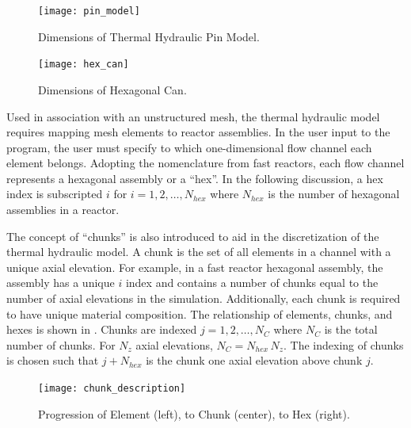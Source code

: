   \begin{figure}
    \centering
    \texttt{[image: pin\_model]}
    \caption{Dimensions of Thermal Hydraulic Pin Model.}
    \label{fig:pin_model}
  \end{figure}

  \begin{figure}
    \centering
    \texttt{[image: hex\_can]}
    \caption{Dimensions of Hexagonal Can.}
    \label{fig:hex_can}
  \end{figure}
  
  Used in association with an unstructured mesh, the thermal hydraulic model
  requires mapping mesh elements to reactor assemblies. In the user input to the
  program, the user must specify to which one-dimensional flow channel each
  element belongs.
  Adopting the nomenclature from fast reactors, each flow channel represents a
  hexagonal assembly or a ``hex''. In the following discussion, a hex index is
  subscripted $i$ for $i = 1,2,\ldots,N_{hex}$ where $N_{hex}$ is the number of
  hexagonal assemblies in a reactor. 

  The concept of ``chunks'' is also introduced to aid in the discretization of
  the thermal hydraulic model. A chunk is the set of all elements in a channel
  with a unique axial elevation. For example, in a fast reactor hexagonal
  assembly, the assembly has a unique $i$ index and contains a number of chunks
  equal to the number of axial elevations in the simulation. Additionally, each 
  chunk is required to have unique material composition. The relationship of
  elements, chunks, and hexes is shown in . Chunks
  are indexed $j = 1,2,\ldots,N_C$ where $N_C$ is the total number of chunks.
  For $N_z$ axial elevations, $N_C = N_{hex} \, N_z$. The indexing
  of chunks is chosen such that $j+N_{hex}$ is the chunk one axial elevation 
  above chunk $j$. 

  \begin{figure}
    \centering
    \texttt{[image: chunk\_description]}
    \caption{Progression of Element (left), to Chunk (center), to Hex (right).}
    \label{fig:chunk_description}
  \end{figure}

